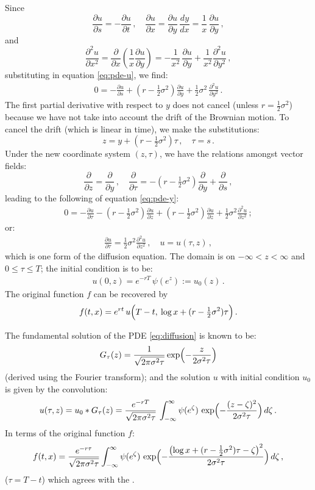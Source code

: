\documentclass[12pt]{article}
\providecommand{\od}[2]{\frac{d #1}{d #2}}
\providecommand{\pd}[2]{\frac{\partial #1}{\partial #2}}
\providecommand{\pdd}[2]{\frac{\partial^2 #1}{\partial #2}}
\begin{document}
Since
\[
\pd{u}{s} = -\pd{u}{t}\,, \quad
 \pd{u}{x} = \pd{u}{y} \, \od{y}{x} = \frac{1}{x} \, \pd{u}{y}\,,
\]
and
\[
\pdd{u}{x^2} = \pd{}{x} \left( \frac{1}{x} \pd{u}{y} \right)
= -\frac{1}{x^2} \, \pd{u}{y} + \frac{1}{x^2} \pdd{u}{y^2}\,,
\]
substituting in equation \eqref{eq:pde-u},
we find:
\begin{align}\label{eq:pde-y}
0 = -\pd{u}{s} + (r- \tfrac12 \sigma^2) \pd{u}{y} + \frac12 \sigma^2 \, \pdd{u}{y^2}\,.
\end{align}
The first partial derivative with respect to $y$
does not cancel (unless $r = \tfrac12 \sigma^2$) 
because we have not take into account
the drift of the Brownian motion.
To cancel the drift (which is linear in time),
we make the substitutions:
\[
z = y + (r - \tfrac12 \sigma^2) \tau\,, \quad \tau = s\,.
\]
Under the new coordinate system $(z,\tau)$, we have the relations
amongst vector fields:
\[
\pd{}{z} = \pd{}{y}\,, \quad \pd{}{\tau} = -(r-\tfrac12 \sigma^2) \pd{}{y} + \pd{}{s}\,,
\]
leading to the following 
of equation \eqref{eq:pde-y}:
\begin{align*}
0 = -\pd{u}{\tau} -(r-\tfrac12 \sigma^2) \pd{u}{z}
+ (r-\tfrac12 \sigma^2) \pd{u}{z} + \frac12 \sigma^2 \pdd{u}{z^2}\,;
\end{align*}
or:
\begin{align}\label{eq:diffusion}
\pd{u}{\tau} = \frac12 \sigma^2 \pdd{u}{z^2}\,, \quad u = u(\tau, z)\,,
\end{align}
which is one form of the diffusion equation.
The domain is on
$-\infty < z < \infty$
and $0 \leq \tau \leq T$;
the initial condition is to be:
\begin{align*}
u(0, z) = e^{-rT} \, \psi(e^{z} ) := u_0(z)\,.
\end{align*}
The original function $f$ can be recovered
by \[
f(t, x) = e^{rt} \, u\Bigl(T-t,\: \log x + (r-\tfrac12 \sigma^2) \tau  \Bigr)\,.
\]

The fundamental solution of the PDE \eqref{eq:diffusion}
is known to be:
\[
G_\tau(z) = \frac{1}{\sqrt{2\pi \sigma^2 \tau}} \exp\Bigl( -\frac{z}{2\sigma^2 \tau} \Bigr)
\]
(derived using the Fourier transform);
and the solution $u$ with initial condition $u_0$
is given by the convolution:
\[
u(\tau, z) = u_0 * G_\tau(z)
= \frac{e^{-rT}}{\sqrt{2\pi \sigma^2 \tau}} \, \int_{-\infty}^\infty \psi(e^\zeta) \,
\exp \Bigl( - \frac{(z-\zeta)^2}{2\sigma^2 \tau} \Bigr) \, d\zeta\,.
\]
In terms of the original function $f$:
\[
f(t, x) = \frac{e^{-r\tau}}{\sqrt{2\pi \sigma^2 \tau}}
\int_{-\infty}^\infty
\psi (e^\zeta)
\,
\exp \Bigl( - \frac{\bigl(\log x + (r-\frac12 \sigma^2)\tau -\zeta\bigr)^2}
{2\sigma^2 \tau} \Bigr) \, d\zeta\,,
\]
($\tau = T -t$) which agrees with the .


\end{document}
